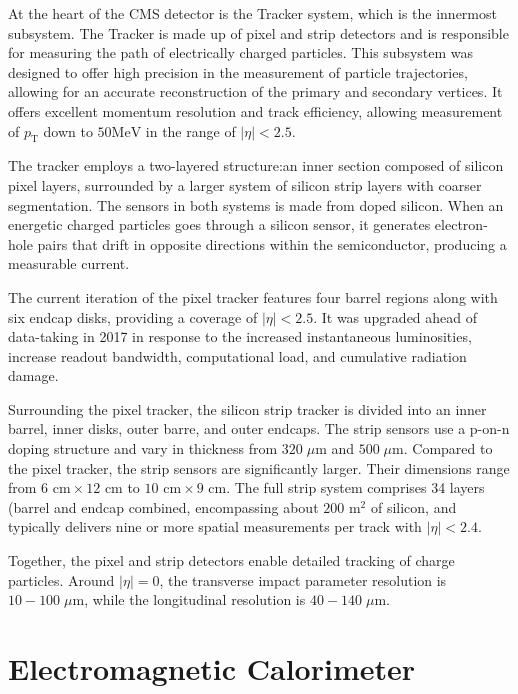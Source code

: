At the heart of the CMS detector is the Tracker system, which is the innermost subsystem. The Tracker is made up of pixel and strip detectors and is responsible for measuring the path of electrically charged particles. This subsystem was designed to offer high precision in the measurement of particle trajectories, allowing for an accurate reconstruction of the primary and secondary vertices. It offers excellent momentum resolution and track efficiency, allowing measurement of $p_{\text{T}}$ down to $50 \text{MeV}$ in the range of $|\eta| < 2.5$.

The tracker employs a two-layered structure:an inner section composed of silicon pixel layers, surrounded by a larger system of silicon strip layers with coarser segmentation. The sensors in both systems is made from doped silicon. When an energetic charged particles goes through a silicon sensor, it generates electron-hole pairs that drift in opposite directions within the semiconductor, producing a measurable current.

The current iteration of the pixel tracker features four barrel regions along with six endcap disks, providing a coverage of $|\eta| <2.5$. It was upgraded ahead of data-taking in 2017 in response to the increased instantaneous luminosities, increase readout bandwidth, computational load, and cumulative radiation damage.

Surrounding the pixel tracker, the silicon strip tracker is divided into an inner barrel, inner disks, outer barre, and outer endcaps. The strip sensors use a p-on-n doping structure and vary in thickness from $320 \;\mu\text{m}$ and $500 \;\mu\text{m}$. Compared to the pixel tracker, the strip sensors are significantly larger. Their dimensions range from $6\text{ cm} \times 12 \text{ cm}$ to $10\text{ cm} \times 9 \text{ cm}$. The full strip system comprises 34 layers (barrel and endcap combined, encompassing about $200 \text{ m}^2$ of silicon, and typically delivers nine or more spatial measurements per track with $|\eta|<2.4$.

Together, the pixel and strip detectors enable detailed tracking of charge particles. Around $|\eta| = 0$, the transverse impact parameter resolution is $10-100 \;\mu\text{m}$, while the longitudinal resolution is $40-140 \;\mu\text{m}$.

\section{Electromagnetic Calorimeter}


